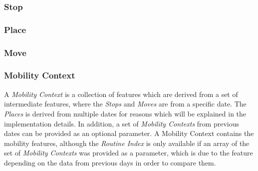 \subsubsection*{Stop}

\subsubsection*{Place}

\subsubsection*{Move}

\subsubsection*{Mobility Context}
A \textit{Mobility Context} is a collection of features which are derived from a set of intermediate features, where the \textit{Stops} and \textit{Moves} are from a specific date. The \textit{Places} is derived from multiple dates for reasons which will be explained in the implementation details. In addition, a set of \textit{Mobility Contexts} from previous dates can be provided as an optional parameter. A Mobility Context contains the mobility features, although the \textit{Routine Index} is only available if an array of the set of \textit{Mobility Contexts} was provided as a parameter, which is due to the feature depending on the data from previous days in order to compare them.

